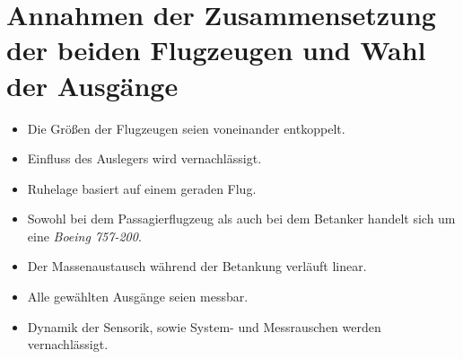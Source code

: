 \section{Annahmen der Zusammensetzung der beiden Flugzeugen und Wahl der Ausgänge} 
\begin{itemize}
\item Die Grö{\ss}en der Flugzeugen seien voneinander entkoppelt.
\item Einfluss des Auslegers wird vernachlässigt.
\item Ruhelage basiert  auf einem geraden Flug.
\item Sowohl bei dem Passagierflugzeug als auch bei dem Betanker handelt sich um eine \textit{Boeing 757-200}.
\item Der Massenaustausch während der Betankung verläuft linear.
\item Alle gewählten Ausgänge seien messbar.
\item Dynamik der Sensorik, sowie System- und Messrauschen werden vernachlässigt. 
\end{itemize}
